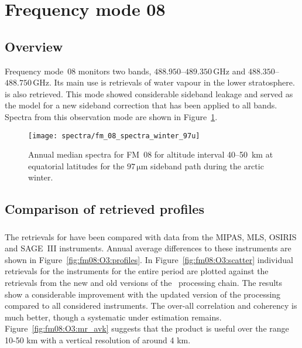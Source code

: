 \section{Frequency mode 08}
\label{sec:fm08}

\subsection{Overview}
\label{sec:fm08:overview}
Frequency mode~08 monitors two bands, $488.950$--$489.350\,\mathrm{GHz}$ and
$488.350$--$488.750\,\mathrm{GHz}$. Its main use is retrievals of water vapour in the lower stratosphere.  is also retrieved.
This mode showed considerable sideband leakage and served as the model for a new sideband correction that has been applied to all bands.
Spectra from this observation mode are shown in Figure~\ref{fig:spectra:08}.

\begin{figure}[ht]
    \texttt{[image: spectra/fm\_08\_spectra\_winter\_97u]}
    \caption{Annual median spectra for FM~08 for altitude interval 40--50~km at
        equatorial latitudes for the $97\,\mathrm{\mu m}$ sideband path during
        the arctic winter.
    }\label{fig:spectra:08}
\end{figure}


\subsection{Comparison of retrieved profiles}
\label{sec:fm08:comparison}



\subsubsection{}
\label{sec:fm08:comparison:O3}
The retrievals for  have been compared with data from the MIPAS, MLS,
OSIRIS and SAGE~III instruments. Annual average differences to these
instruments are shown in Figure~\ref{fig:fm08:O3:profiles}. In
Figure~\ref{fig:fm08:O3:scatter} individual retrievals for the instruments for
the entire period are plotted against the retrievals from the new and old
versions of the \smr\ processing chain. The results show a considerable
improvement with the updated version of the processing compared to all
considered instruments. The over-all correlation and coherency is much better,
though a systematic under estimation remains.
Figure~\ref{fig:fm08:O3:mr_avk} suggests that the product is useful over the range 10-50 km with a vertical resolution of around 4 km.


